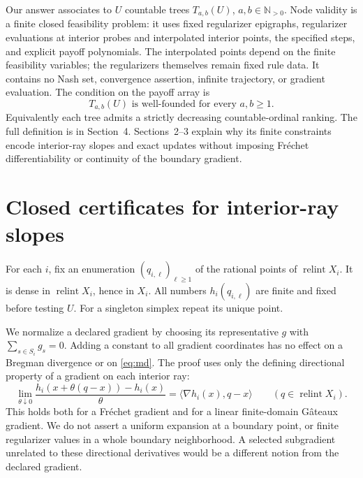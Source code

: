 \documentclass[11pt,a4paper]{article}
\newcommand{\N}{\mathbb N}
\newcommand{\ri}{\operatorname{relint}}
\begin{document}
Our answer associates to \(U\) countable trees \(T_{a,b}(U)\),
\(a,b\in\N_{>0}\). Node validity is a finite closed feasibility problem:
it uses fixed regularizer epigraphs, regularizer evaluations at interior probes
and interpolated interior points, the specified steps, and explicit payoff
polynomials. The interpolated points depend on the finite feasibility variables;
the regularizers themselves remain fixed rule data. It contains no Nash set,
convergence assertion, infinite trajectory, or gradient evaluation.
The condition on the payoff array is
\begin{equation}
\boxed{\quad T_{a,b}(U)\text{ is well-founded for every }a,b\ge1.\quad}
\label{eq:wf}
\end{equation}
Equivalently each tree admits a strictly decreasing countable-ordinal ranking.
The full definition is in Section~4. Sections~2--3 explain why its finite
constraints encode interior-ray slopes and exact updates without imposing
Fr\'echet differentiability or continuity of the boundary gradient.

\section{Closed certificates for interior-ray slopes}

For each \(i\), fix an enumeration \((q_{i,\ell})_{\ell\ge1}\) of the
rational points of \(\ri X_i\). It is dense in \(\ri X_i\), hence in \(X_i\).
All numbers \(h_i(q_{i,\ell})\) are finite and fixed before testing \(U\).
For a singleton simplex repeat its unique point.

We normalize a declared gradient by choosing its representative \(g\) with
\(\sum_{s\in S_i}g_s=0\). Adding a constant to all gradient coordinates
has no effect on a Bregman divergence or on \eqref{eq:md}.
The proof uses only the defining directional property of a gradient on each
interior ray:
\begin{equation}
\lim_{\theta\downarrow0}
\frac{h_i(x+\theta(q-x))-h_i(x)}{\theta}
=\langle\nabla h_i(x),q-x\rangle\qquad(q\in\ri X_i).
\label{eq:dp}
\end{equation}
This holds both for a Fr\'echet gradient and for a linear finite-domain
G\^ateaux gradient. We do not assert a uniform expansion at a boundary point,
or finite regularizer values in a whole boundary neighborhood. A selected
subgradient unrelated to these directional derivatives would be a different
notion from the declared gradient.
\end{document}
